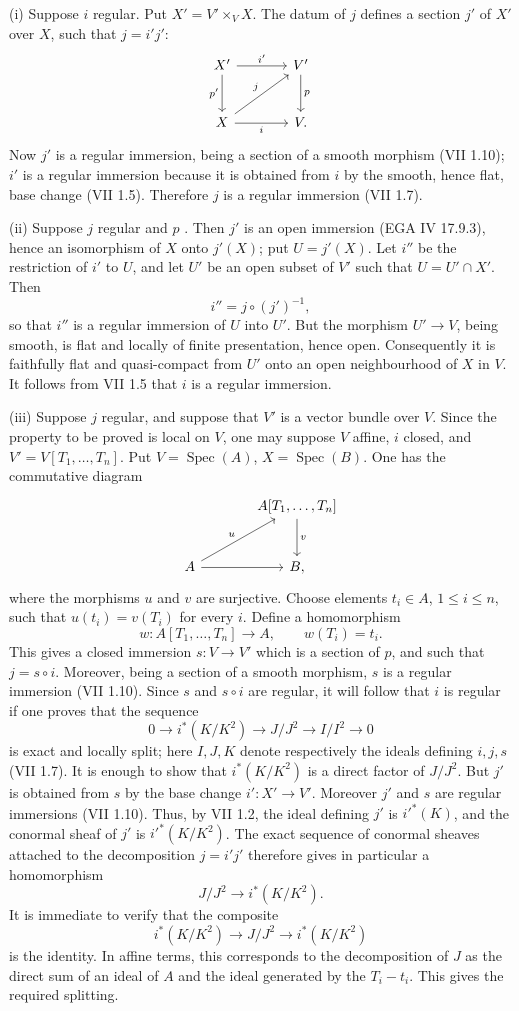 \documentclass[11pt]{article}
\newcommand{\Spec}{\operatorname{Spec}}
\begin{document}
(i) Suppose $i$ regular. Put $X'=V'\times_V X$. The datum of $j$ defines a section $j'$ of $X'$ over $X$, such that $j=i'j'$:
\[
\begin{tikzcd}[column sep=large,row sep=large]
X' \arrow[r,"i'"] \arrow[d,"p'"'] & V' \arrow[d,"p"]\\
X \arrow[r,"i"'] \arrow[ur,"j"] & V .
\end{tikzcd}
\]
Now $j'$ is a regular immersion, being a section of a smooth morphism (VII 1.10); $i'$ is a regular immersion because it is obtained from $i$ by the smooth, hence flat, base change (VII 1.5). Therefore $j$ is a regular immersion (VII 1.7).

(ii) Suppose $j$ regular and $p$ \etale. Then $j'$ is an open immersion (EGA IV 17.9.3), hence an isomorphism of $X$ onto $j'(X)$; put $U=j'(X)$. Let $i''$ be the restriction of $i'$ to $U$, and let $U'$ be an open subset of $V'$ such that $U=U'\cap X'$. Then
\[
i''=j\circ(j')^{-1},
\]
so that $i''$ is a regular immersion of $U$ into $U'$. But the morphism $U'\to V$, being smooth, is flat and locally of finite presentation, hence open. Consequently it is faithfully flat and quasi-compact from $U'$ onto an open neighbourhood of $X$ in $V$. It follows from VII 1.5 that $i$ is a regular immersion.

(iii) Suppose $j$ regular, and suppose that $V'$ is a vector bundle over $V$. Since the property to be proved is local on $V$, one may suppose $V$ affine, $i$ closed, and $V'=V[T_1,\ldots,T_n]$. Put $V=\Spec(A)$, $X=\Spec(B)$. One has the commutative diagram
\[
\begin{tikzcd}[column sep=large,row sep=large]
& A[T_1,\ldots,T_n] \arrow[d,"v"]\\
A \arrow[r] \arrow[ur,"u"] & B,
\end{tikzcd}
\]
where the morphisms $u$ and $v$ are surjective. Choose elements $t_i\in A$, $1\leq i\leq n$, such that $u(t_i)=v(T_i)$ for every $i$. Define a homomorphism
\[
w:A[T_1,\ldots,T_n]\longrightarrow A,
\qquad w(T_i)=t_i.
\]
This gives a closed immersion $s:V\to V'$ which is a section of $p$, and such that $j=s\circ i$. Moreover, being a section of a smooth morphism, $s$ is a regular immersion (VII 1.10). Since $s$ and $s\circ i$ are regular, it will follow that $i$ is regular if one proves that the sequence
\[
0\longrightarrow i^*(K/K^2)\longrightarrow J/J^2\longrightarrow I/I^2\longrightarrow 0
\]
is exact and locally split; here $I,J,K$ denote respectively the ideals defining $i,j,s$ (VII 1.7). It is enough to show that $i^*(K/K^2)$ is a direct factor of $J/J^2$. But $j'$ is obtained from $s$ by the base change $i':X'\to V'$. Moreover $j'$ and $s$ are regular immersions (VII 1.10). Thus, by VII 1.2, the ideal defining $j'$ is $i'^*(K)$, and the conormal sheaf of $j'$ is $i'^*(K/K^2)$. The exact sequence of conormal sheaves attached to the decomposition $j=i'j'$ therefore gives in particular a homomorphism
\[
J/J^2\longrightarrow i^*(K/K^2).
\]
It is immediate to verify that the composite
\[
i^*(K/K^2)\longrightarrow J/J^2\longrightarrow i^*(K/K^2)
\]
is the identity. In affine terms, this corresponds to the decomposition of $J$ as the direct sum of an ideal of $A$ and the ideal generated by the $T_i-t_i$. This gives the required splitting.
\end{document}
